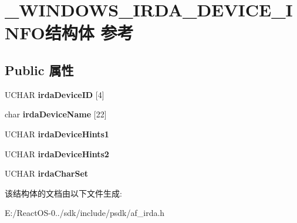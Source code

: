 \hypertarget{struct___w_i_n_d_o_w_s___i_r_d_a___d_e_v_i_c_e___i_n_f_o}{}\section{\+\_\+\+W\+I\+N\+D\+O\+W\+S\+\_\+\+I\+R\+D\+A\+\_\+\+D\+E\+V\+I\+C\+E\+\_\+\+I\+N\+F\+O结构体 参考}
\label{struct___w_i_n_d_o_w_s___i_r_d_a___d_e_v_i_c_e___i_n_f_o}
\subsection*{Public 属性}
\begin{DoxyCompactItemize}
\item 
\mbox{\label{struct___w_i_n_d_o_w_s___i_r_d_a___d_e_v_i_c_e___i_n_f_o_a21038ac54e5f969a6e21dbefd5d0b51b}} 
U\+C\+H\+AR {\bfseries irda\+Device\+ID} \mbox{[}4\mbox{]}
\item 
\mbox{\label{struct___w_i_n_d_o_w_s___i_r_d_a___d_e_v_i_c_e___i_n_f_o_ab48cad5f3473f40ef240587cd9e1d126}} 
char {\bfseries irda\+Device\+Name} \mbox{[}22\mbox{]}
\item 
\mbox{\label{struct___w_i_n_d_o_w_s___i_r_d_a___d_e_v_i_c_e___i_n_f_o_a61c6109004bb79caca18f021153bc5a0}} 
U\+C\+H\+AR {\bfseries irda\+Device\+Hints1}
\item 
\mbox{\label{struct___w_i_n_d_o_w_s___i_r_d_a___d_e_v_i_c_e___i_n_f_o_a7ed20b0f2ee1b0b3ab484e0fb33aac19}} 
U\+C\+H\+AR {\bfseries irda\+Device\+Hints2}
\item 
\mbox{\label{struct___w_i_n_d_o_w_s___i_r_d_a___d_e_v_i_c_e___i_n_f_o_afb12c3139bf6afb341d935f895e9ead9}} 
U\+C\+H\+AR {\bfseries irda\+Char\+Set}
\end{DoxyCompactItemize}


该结构体的文档由以下文件生成\+:\begin{DoxyCompactItemize}
\item 
E\+:/\+React\+O\+S-\/0../sdk/include/psdk/af\+\_\+irda.\+h\end{DoxyCompactItemize}
